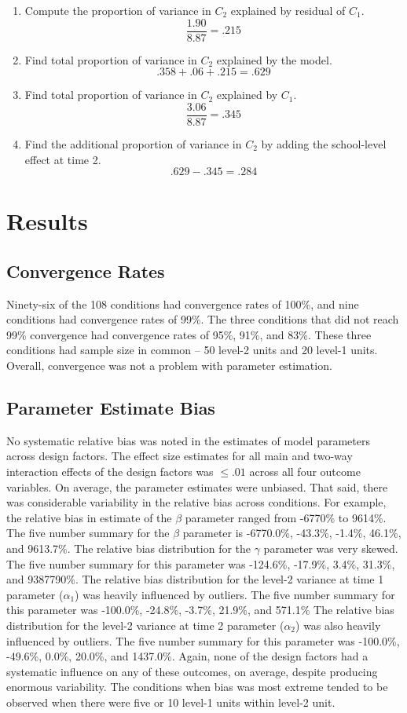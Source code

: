 \documentclass[man]{apa6}
\begin{document}
\begin{enumerate}
\item Compute the proportion of variance in $C_2$ explained by residual of $C_1$.
\[ \frac{1.90}{8.87} = .215 \]

\item Find total proportion of variance in $C_2$ explained by the model.
\[ .358 + .06 + .215 = .629 \]

\item Find total proportion of variance in $C_2$ explained by $C_1$.
\[ \frac{3.06}{8.87}=.345 \]

\item Find the additional proportion of variance in $C_2$ by adding the school-level effect at time 2.
\[ .629 - .345 = .284 \]

\end{enumerate}


\section*{Results}
\subsection*{Convergence Rates}
Ninety-six of the 108 conditions had convergence rates of 100\%, and nine conditions had convergence rates of 99\%. The three conditions that did not reach 99\% convergence had convergence rates of 95\%, 91\%, and 83\%. These three conditions had sample size in common -- 50 level-2 units and 20 level-1 units. Overall, convergence was not a problem with parameter estimation.

\subsection*{Parameter Estimate Bias}
No systematic relative bias was noted in the estimates of model parameters across design factors. The effect size estimates for all main and two-way interaction effects of the design factors was $\leq .01$ across all four outcome variables. On average, the parameter estimates were unbiased. That said, there was considerable variability in the relative bias across conditions. For example, the relative bias in estimate of the $\beta$ parameter ranged from -6770\% to 9614\%. The five number summary for the $\beta$ parameter is -6770.0\%, -43.3\%, -1.4\%, 46.1\%, and 9613.7\%. The relative bias distribution for the $\gamma$ parameter was very skewed. The five number summary for this parameter was -124.6\%, -17.9\%, 3.4\%, 31.3\%, and 9387790\%. The relative bias distribution for the level-2 variance at time 1 parameter ($\alpha_1$) was heavily influenced by outliers. The five number summary for this parameter was -100.0\%, -24.8\%, -3.7\%, 21.9\%, and 571.1\% The relative bias distribution for the level-2 variance at time 2 parameter ($\alpha_2$) was also heavily influenced by outliers. The five number summary for this parameter was -100.0\%, -49.6\%, 0.0\%, 20.0\%, and 1437.0\%. Again, none of the design factors had a systematic influence on any of these outcomes, on average, despite producing enormous variability. The conditions when bias was most extreme tended to be observed when there were five or 10 level-1 units within level-2 unit. 
\end{document}
